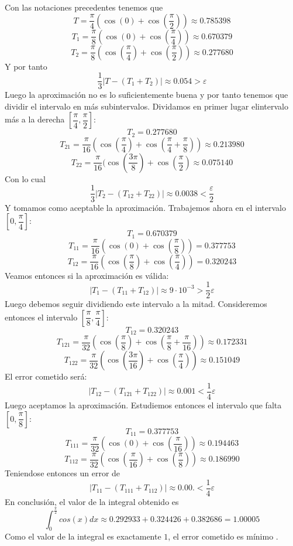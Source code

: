 \begin{sol}
Con las notaciones precedentes tenemos que
$$T=\dfrac{\pi}{4}(\cos(0)+\cos\left(\dfrac{\pi}{2}\right))\approx 0.785398$$
$$T_1=\dfrac{\pi}{8}(\cos(0)+\cos\left(\dfrac{\pi}{4}\right))\approx 0.670379$$
$$T_2=\dfrac{\pi}{8}(\cos\left(\dfrac{\pi}{4}\right)+\cos\left(\dfrac{\pi}{2}\right))\approx 0.277680$$
Y por tanto
$$\dfrac{1}{3}|T-(T_1+T_2)|\approx 0.054>\varepsilon$$
Luego la aproximación no es lo suficientemente buena y por tanto tenemos que dividir el intervalo en más subintervalos. Dividamos en primer lugar elintervalo más a la derecha $\left[\dfrac{\pi}{4},\dfrac{\pi}{2}\right]$:
$$T_2=0.277680$$
$$T_{21}=\dfrac{\pi}{16}(\cos\left(\dfrac{\pi}{4}\right)+\cos\left(\dfrac{\pi}{4}+\dfrac{\pi}{8}\right))\approx 0.213980$$
$$T_{22}=\dfrac{\pi}{16}(\cos\left(\dfrac{3\pi}{8}\right)+\cos\left(\dfrac{\pi}{2}\right)\approx 0.075140$$
Con lo cual
$$\dfrac{1}{3}|T_2-(T_{12}+T_{22})|\approx 0.0038<\dfrac{\varepsilon}{2}$$
Y tomamos como aceptable la aproximación. Trabajemos ahora en el intervalo $\left[0,\dfrac{\pi}{4}\right]$:
$$T_1=0.670379$$
$$T_{11}=\dfrac{\pi}{16}(\cos(0)+\cos\left(\dfrac{\pi}{8}\right))=0.377753$$
$$T_{12}=\dfrac{\pi}{16}(\cos\left(\dfrac{\pi}{8}\right)+\cos\left(\dfrac{\pi}{4}\right))=0.320243$$
Veamos entonces si la aproximación es válida:
$$|T_1-(T_{11}+T_{12})|\approx 9\cdot 10^{-3}>\dfrac{1}{2}\varepsilon$$
Luego debemos seguir dividiendo este intervalo a la mitad. Consideremos entonces el intervalo $\left[\dfrac{\pi}{8},\dfrac{\pi}{4}\right]$:
$$T_{12}=0.320243$$
$$T_{121}=\dfrac{\pi}{32}(\cos\left(\dfrac{\pi}{8}\right)+\cos\left(\dfrac{\pi}{8}+\dfrac{\pi}{16}\right))\approx0.172331$$
$$T_{122}=\dfrac{\pi}{32}(\cos\left(\dfrac{3\pi}{16}\right)+\cos\left(\dfrac{\pi}{4}\right))\approx0.151049$$
El error cometido será:
$$|T_{12}-(T_{121}+T_{122})|\approx 0.001<\dfrac{1}{4}\varepsilon$$
Luego aceptamos la aproximación. Estudiemos entonces el intervalo que falta $\left[0,\dfrac{\pi}{8}\right]$:
$$T_{11}=0.377753$$
$$T_{111}=\dfrac{\pi}{32}(\cos(0)+\cos\left(\dfrac{\pi}{16}\right))\approx0.194463$$
$$T_{112}=\dfrac{\pi}{32}(\cos\left(\dfrac{\pi}{16}\right)+\cos\left(\dfrac{\pi}{8}\right))\approx 0.186990$$
Teniendose entonces un error de
$$|T_{11}-(T_{111}+T_{112})|\approx 0.00.<\dfrac{1}{4}\varepsilon$$
En conclusión, el valor de la integral obtenido es
$$\int_0^{\frac{\pi}{2}}cos(x)dx\approx0.292933+0.324426+0.382686=1.00005$$
Como el valor de la integral es exactamente $1$, el error cometido es mínimo .

 \end{sol}
